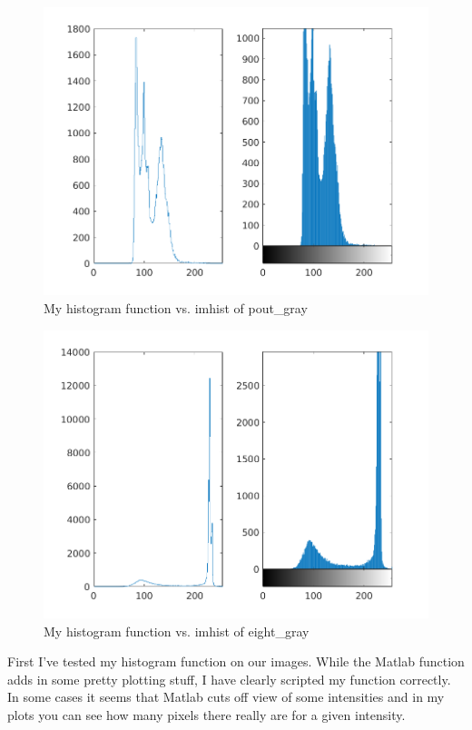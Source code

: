 \begin{figure}[H]
    \centering
    \includegraphics[scale=0.75]{pout_gray_compare.png}
    \caption{My histogram function vs. imhist of pout\_gray}
\end{figure}

\begin{figure}[H]
    \centering
    \includegraphics[scale=0.75]{eight_gray_compare.png}
    \caption{My histogram function vs. imhist of eight\_gray}
\end{figure}

First I've tested my histogram function on our images. While the Matlab function
adds in some pretty plotting stuff, I have clearly scripted my function
correctly. In some cases it seems that Matlab cuts off view of some intensities
and in my plots you can see how many pixels there really are for a given
intensity.

